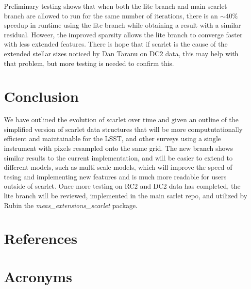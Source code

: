 \documentclass[DM,authoryear,toc]{lsstdoc}
\begin{document}
Preliminary testing shows that when both the lite branch and main scarlet branch are allowed to run for the same number of iterations, there is an $\sim$40\% speedup in runtime using the lite branch while obtaining a result with a similar residual. Howeer, the improved sparsity allows the lite branch to converge faster with less extended features. There is hope that if scarlet is the cause of the extended stellar sizes noticed by Dan Taranu on DC2 data, this may help with that problem, but more testing is needed to confirm this.

\section{Conclusion}

We have outlined the evolution of scarlet over time and given an outline of the simplified version of scarlet data structures that will be more compututationally efficient and maintainable for the LSST, and other surveys using a single instrument with pixels resampled onto the same grid. The new branch shows similar results to the current implementation, and will be easier to extend to different models, such as multi-scale models, which will improve the speed of tesing and implementing new features and is much more readable for users outside of scarlet. Once more testing on RC2 and DC2 data has completed, the lite branch will be reviewed, implemented in the main sarlet repo, and utilized by Rubin the \emph{meas\_extensions\_scarlet} package.

\appendix
\section{References} \label{sec:bib}
\renewcommand{\refname}{} %


\section{Acronyms} \label{sec:acronyms}

\end{document}
